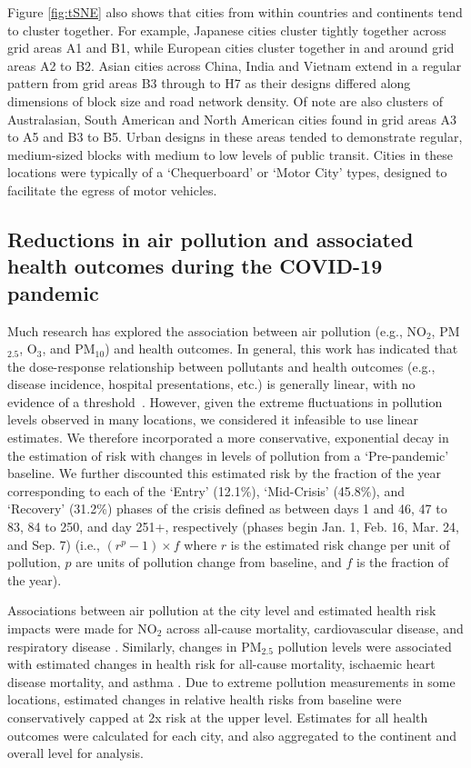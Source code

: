 \documentclass[preprint,10pt]{elsarticle} %
\begin{document}
Figure \ref{fig:tSNE} also shows that cities from within countries and continents tend to cluster together. For example, Japanese cities cluster tightly together across grid areas A1 and B1, while European cities cluster together in and around grid areas A2 to B2. Asian cities across China, India and Vietnam extend in a regular pattern from grid areas B3 through to H7 as their designs differed along dimensions of block size and road network density. Of note are also clusters of Australasian, South American and North American cities found in grid areas A3 to A5 and B3 to B5. Urban designs in these areas tended to demonstrate regular, medium-sized blocks with medium to low levels of public transit. Cities in these locations were typically of a `Chequerboard' or `Motor City' types, designed to facilitate the egress of motor vehicles.

\subsection*{Reductions in air pollution and associated health outcomes during the COVID-19 pandemic}
Much research has explored the association between air pollution (e.g., NO$_{2}$, PM$_{2.5}$, O$_{3}$, and PM$_{10}$) and health outcomes. In general, this work has indicated that the dose-response relationship between pollutants and health outcomes (e.g., disease incidence, hospital presentations, etc.) is generally linear, with no evidence of a threshold~\cite{schwartz2002concentration}. However, given the extreme fluctuations in pollution levels observed in many locations, we considered it infeasible to use linear estimates. We therefore incorporated a more conservative, exponential decay in the estimation of risk with changes in levels of pollution from a `Pre-pandemic' baseline. We further discounted this estimated risk by the fraction of the year corresponding to each of the `Entry' (12.1\%), `Mid-Crisis' (45.8\%), and `Recovery' (31.2\%) phases of the crisis defined as between days 1 and 46, 47 to 83, 84 to 250, and day 251+, respectively (phases begin Jan. 1, Feb. 16, Mar. 24, and Sep. 7) (i.e., $(r^{p}-1) \times f$ where $r$ is the estimated risk change per unit of pollution, $p$ are units of pollution change from baseline, and $f$ is the fraction of the year). 

Associations between air pollution at the city level and estimated health risk impacts were made for NO$_{2}$ across all-cause mortality, cardiovascular disease, and respiratory disease \cite{Huang19Pollution}. Similarly, changes in PM$_{2.5}$ pollution levels were associated with estimated changes in health risk for all-cause mortality, ischaemic heart disease mortality, and asthma \cite{Xie257, Yu2020PM2.5, BALTI2014161}. Due to extreme pollution measurements in some locations, estimated changes in relative health risks from baseline were conservatively capped at 2x risk at the upper level. Estimates for all health outcomes were calculated for each city, and also aggregated to the continent and overall level for analysis. 
\end{document}

